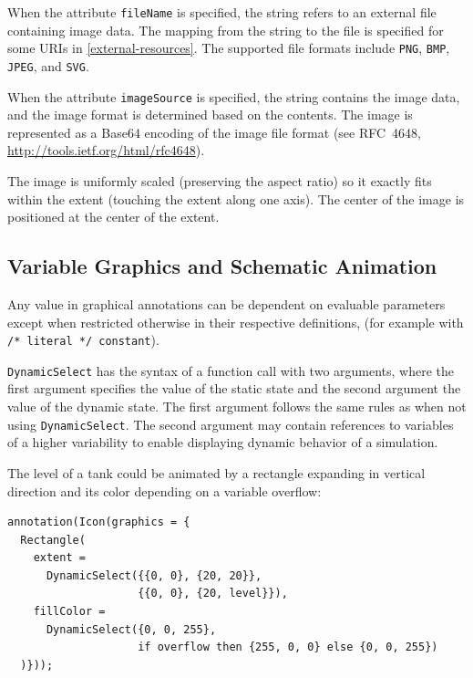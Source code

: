 When the attribute \lstinline!fileName! is specified, the string refers to an external file containing image data.
The mapping from the string to the file is specified for some URIs in \cref{external-resources}.
The supported file formats include \lstinline!PNG!, \lstinline!BMP!, \lstinline!JPEG!, and \lstinline!SVG!.

When the attribute \lstinline!imageSource! is specified, the string contains the image data, and the image format is determined based on the contents.
The image is represented as a Base64 encoding of the image file format (see RFC~4648, \url{http://tools.ietf.org/html/rfc4648}).

The image is uniformly scaled (preserving the aspect ratio) so it exactly fits within the extent (touching the extent along one axis).
The center of the image is positioned at the center of the extent.

\subsection{Variable Graphics and Schematic Animation}\label{variable-graphics-and-schematic-animation}

Any value in graphical annotations can be dependent on evaluable parameters except when restricted otherwise in their respective definitions, (for example with \lstinline!/* literal */ constant!).

\lstinline!DynamicSelect! has the syntax of a function call with two arguments, where the first argument specifies the value of the static state and the second argument the value of the dynamic state.
The first argument follows the same rules as when not using \lstinline!DynamicSelect!.
The second argument may contain references to variables of a higher variability to enable displaying dynamic behavior of a simulation.


\begin{example}
The level of a tank could be animated by a rectangle expanding in vertical direction and its color depending on a variable overflow:
\begin{lstlisting}[language=modelica]
annotation(Icon(graphics = {
  Rectangle(
    extent =
      DynamicSelect({{0, 0}, {20, 20}},
                    {{0, 0}, {20, level}}),
    fillColor =
      DynamicSelect({0, 0, 255},
                    if overflow then {255, 0, 0} else {0, 0, 255})
  )}));
\end{lstlisting}
\end{example}

